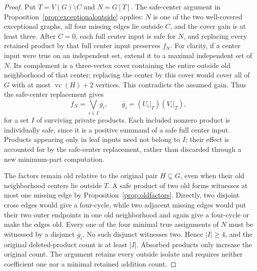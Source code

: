 \documentclass[11pt]{article}
\newcommand{\vc}{\operatorname{vc}}
\theoremstyle{definition}
\theoremstyle{remark}
\begin{document}
\begin{proof}
Put $T=V(G)\setminus C$ and $N=G[T]$. The safe-center argument in Proposition~\ref{prop:exceptionaloutside} applies: $N$ is one of the two well-covered exceptional graphs, all four missing edges lie outside $C$, and the cover gain is at least three. After $C=0$, each full center input is safe for $N$, and replacing every retained product by that full center input preserves $f_N$. For clarity, if a center input were true on an independent set, extend it to a maximal independent set of $N$. Its complement is a three-vertex cover containing the entire outside old neighborhood of that center; replacing the center by this cover would cover all of $G$ with at most $\vc(H)+2$ vertices. This contradicts the assumed gain. Thus the safe-center replacement gives
\[
 f_N=\bigvee_{i\in I}\overline{g_i},
 \qquad
 \overline{g_i}=(U_i|_T)(V_i|_T),
\]
for a set $I$ of surviving private products. Each included nonzero product is individually safe, since it is a positive summand of a safe full center input. Products appearing only in leaf inputs need not belong to $I$; their effect is accounted for by the safe-center replacement, rather than discarded through a new minimum-part computation.

The factors remain old relative to the original pair $H\subseteq G$, even when their old neighborhood centers lie outside $T$. A safe product of two old forms witnesses at most one missing edge by Proposition~\ref{prop:oldfactors}. Directly, two disjoint cross edges would give a four-cycle, while two adjacent missing edges would put their two outer endpoints in one old neighborhood and again give a four-cycle or make the edges old. Every one of the four minimal true assignments of $N$ must be witnessed by a disjunct $\overline{g_i}$. No such disjunct witnesses two. Hence $|I|\ge4$, and the original deleted-product count is at least $|I|$. Absorbed products only increase the original count. The argument retains every outside isolate and requires neither coefficient one nor a minimal retained addition count.
\end{proof}
\end{document}
